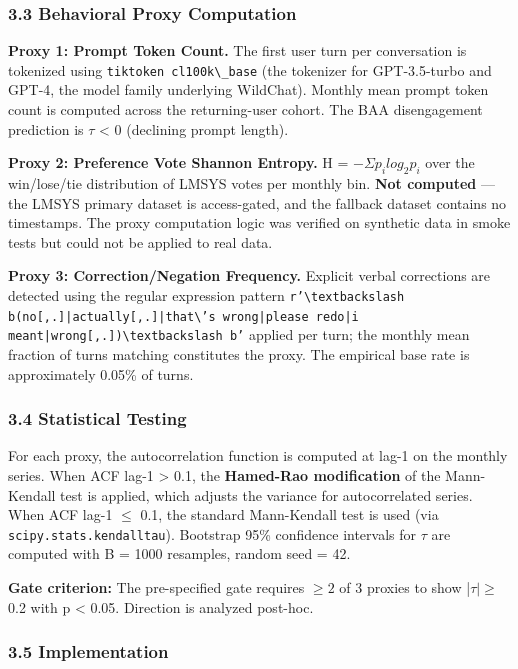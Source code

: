 \subsubsection{3.3 Behavioral Proxy Computation}

\textbf{Proxy 1: Prompt Token Count.} The first user turn per conversation is tokenized using \texttt{tiktoken cl100k\textbackslash \_base} (the tokenizer for GPT-3.5-turbo and GPT-4, the model family underlying WildChat). Monthly mean prompt token count is computed across the returning-user cohort. The BAA disengagement prediction is $\tau$ < 0 (declining prompt length).

\textbf{Proxy 2: Preference Vote Shannon Entropy.} H = $-\Sigma p_i log_2 p_i$ over the win/lose/tie distribution of LMSYS votes per monthly bin. \textbf{Not computed} --- the LMSYS primary dataset is access-gated, and the fallback dataset contains no timestamps. The proxy computation logic was verified on synthetic data in smoke tests but could not be applied to real data.

\textbf{Proxy 3: Correction/Negation Frequency.} Explicit verbal corrections are detected using the regular expression pattern \texttt{r'\textbackslash textbackslash b(no[,.]|actually[,.]|that\textbackslash 's wrong|please redo|i meant|wrong[,.])\textbackslash textbackslash b'} applied per turn; the monthly mean fraction of turns matching constitutes the proxy. The empirical base rate is approximately 0.05\% of turns.

\subsubsection{3.4 Statistical Testing}

For each proxy, the autocorrelation function is computed at lag-1 on the monthly series. When ACF lag-1 > 0.1, the \textbf{Hamed-Rao modification} of the Mann-Kendall test is applied, which adjusts the variance for autocorrelated series. When ACF lag-1 $\leq$ 0.1, the standard Mann-Kendall test is used (via \texttt{scipy.stats.kendalltau}). Bootstrap 95\% confidence intervals for $\tau$ are computed with B = 1000 resamples, random seed = 42.

\textbf{Gate criterion:} The pre-specified gate requires $\geq 2$ of 3 proxies to show |$\tau | \geq$ 0.2 with p < 0.05. Direction is analyzed post-hoc.

\subsubsection{3.5 Implementation}

